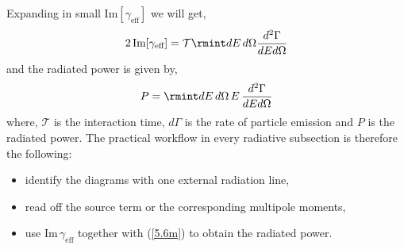 Expanding in small $\text{Im}[\gamma_{\text{eff}}]$ we will get,
\begin{align}
    \begin{split}
        2\,\text{Im}[\gamma_{\text{eff}}]=\mathcal{T}\rmint dE\,d\Omega \frac{d^2\Gamma}{dEd\Omega}\label{4.6}
    \end{split}
\end{align}
and the radiated power is given by,
\begin{align}
    \begin{split}
        P=\rmint dE\,d\Omega\,E\,\frac{d^2\Gamma}{dEd\Omega}\label{5.6m}
    \end{split}
\end{align}
where, $\mathcal{T}$ is the interaction time, $d\Gamma$ is the rate of particle emission and $P$ is the radiated power. The practical workflow in every radiative subsection is therefore the following:
\begin{itemize}
    \item identify the diagrams with one external radiation line,
    \item read off the source term or the corresponding multipole moments,
    \item use $\text{Im}\,\gamma_{\text{eff}}$ together with (\ref{5.6m}) to obtain the radiated power.
\end{itemize}
